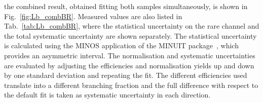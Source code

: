 %
%
%
%
%
%
the combined result, obtained fitting both samples simultaneously, is shown in Fig.~\ref{fig:Lb_combBR}.
Measured values are also listed in Tab.~\ref{tab:Lb_combBR}, where the statistical
uncertainty on the rare channel and the total systematic uncertainty are shown separately.
The statistical uncertainty is calculated using the MINOS application of the MINUIT package~\cite{James:1975dr},
which provides an asymmetric interval.
The normalisation and systematic uncertainties are evaluated by adjusting the efficiencies and normalisation yields
up and down by one standard deviation and repeating the fit.
The different efficiencies used translate into a different branching fraction and the full difference with respect 
to the default fit is taken as systematic uncertainty in each direction.


